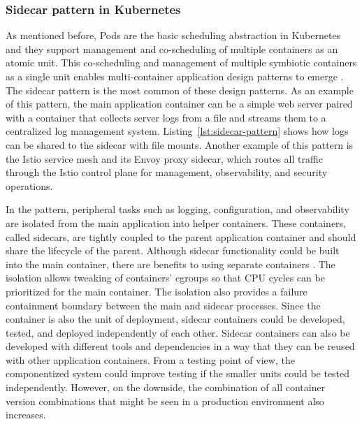 \documentclass[english, 12pt, a4paper, sci, utf8, a-2b, online]{aaltothesis}
\begin{document}
\subsubsection{Sidecar pattern in Kubernetes}

As mentioned before, Pods are the basic scheduling abstraction in Kubernetes and they support management and co-scheduling of multiple containers as an atomic unit.
This co-scheduling and management of multiple symbiotic containers as a single unit enables multi-container application design patterns to emerge \cite{burns2016design}.
The sidecar pattern is the most common of these design patterns.
As an example of this pattern, the main application container can be a simple web server paired with a container that collects server logs from a file and streams them to a centralized log management system.
Listing~\ref{lst:sidecar-pattern} shows how logs can be shared to the sidecar with file mounts.
Another example of this pattern is the Istio service mesh \cite{istio} and its Envoy proxy sidecar, which routes all traffic through the Istio control plane for management, observability, and security operations.



In the pattern, peripheral tasks such as logging, configuration, and observability are isolated from the main application into helper containers.
These containers, called sidecars, are tightly coupled to the parent application container and should share the lifecycle of the parent.
Although sidecar functionality could be built into the main container, there are benefits to using separate containers \cite{burns2016design}.
The isolation allows tweaking of containers' cgroups so that CPU cycles can be prioritized for the main container.
The isolation also provides a failure containment boundary between the main and sidecar processes.
Since the container is also the unit of deployment, sidecar containers could be developed, tested, and deployed independently of each other.
Sidecar containers can also be developed with different tools and dependencies in a way that they can be reused with other application containers.
From a testing point of view, the componentized system could improve testing if the smaller units could be tested independently.
However, on the downside, the combination of all container version combinations that might be seen in a production environment also increases.
\end{document}
